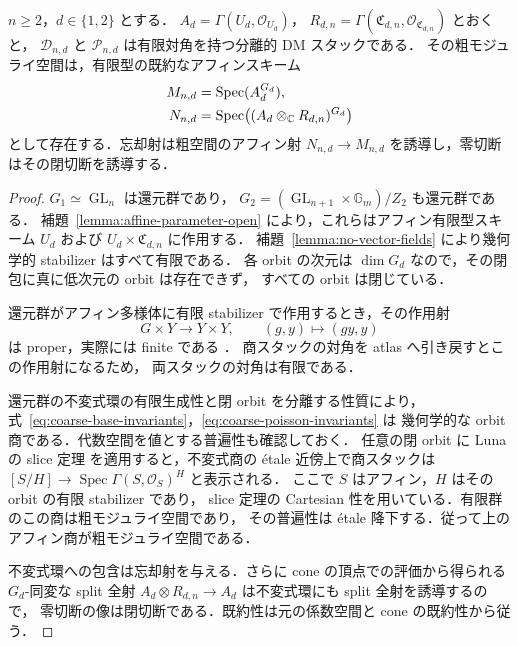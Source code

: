 \begin{theorem}[全滑らか領域の粗モジュライ空間]
\label{thm:affine-coarse-moduli}
$n\geq2$，$d\in\{1,2\}$ とする．
$A_d=\Gamma(U_d,\mathcal O_{U_d})$，
$R_{d,n}=\Gamma(\mathfrak C_{d,n},\mathcal O_{\mathfrak C_{d,n}})$ とおくと，
$\mathcal D_{n,d}$ と $\mathcal P_{n,d}$ は有限対角を持つ分離的 DM スタックである．
その粗モジュライ空間は，有限型の既約なアフィンスキーム
\begin{align}
 M_{n,d}&=\operatorname{Spec}(A_d^{G_d}),
 \label{eq:coarse-base-invariants}\\
 N_{n,d}&=\operatorname{Spec}\bigl((A_d\otimes_\mathbb C R_{d,n})^{G_d}\bigr)
 \label{eq:coarse-poisson-invariants}
\end{align}
として存在する．忘却射は粗空間のアフィン射
$N_{n,d}\to M_{n,d}$ を誘導し，零切断はその閉切断を誘導する．
\end{theorem}

\begin{proof}
$G_1\simeq\operatorname{GL}_n$ は還元群であり，
$G_2=(\operatorname{GL}_{n+1}\times\mathbb G_m)/Z_2$ も還元群である．
補題~\ref{lemma:affine-parameter-open} により，これらはアフィン有限型スキーム
$U_d$ および $U_d\times\mathfrak C_{d,n}$ に作用する．
補題~\ref{lemma:no-vector-fields} により幾何学的 stabilizer はすべて有限である．
各 orbit の次元は $\dim G_d$ なので，その閉包に真に低次元の orbit は存在できず，
すべての orbit は閉じている．

還元群がアフィン多様体に有限 stabilizer で作用するとき，その作用射
\[
 G\times Y\longrightarrow Y\times Y,\qquad(g,y)\longmapsto(gy,y)
\]
は proper，実際には finite である
\cite[I, \S4, Corollaire, p.~90]{Luna1973}．
商スタックの対角を atlas へ引き戻すとこの作用射になるため，
両スタックの対角は有限である．

還元群の不変式環の有限生成性と閉 orbit を分離する性質により，
式~\eqref{eq:coarse-base-invariants}，\eqref{eq:coarse-poisson-invariants} は
幾何学的な orbit 商である．代数空間を値とする普遍性も確認しておく．
任意の閉 orbit に Luna の slice 定理
\cite[III, \S1, Th\'eor\`eme du slice \'etale, p.~97]{Luna1973}
を適用すると，不変式商の \'etale 近傍上で商スタックは
$[S/H]\to\operatorname{Spec}\Gamma(S,\mathcal O_S)^H$ と表示される．
ここで $S$ はアフィン，$H$ はその orbit の有限 stabilizer であり，
slice 定理の Cartesian 性を用いている．有限群のこの商は粗モジュライ空間であり，
その普遍性は \'etale 降下する．従って上のアフィン商が粗モジュライ空間である．

不変式環への包含は忘却射を与える．さらに cone の頂点での評価から得られる
$G_d$-同変な split 全射
$A_d\otimes R_{d,n}\to A_d$ は不変式環にも split 全射を誘導するので，
零切断の像は閉切断である．既約性は元の係数空間と cone の既約性から従う．
\end{proof}

